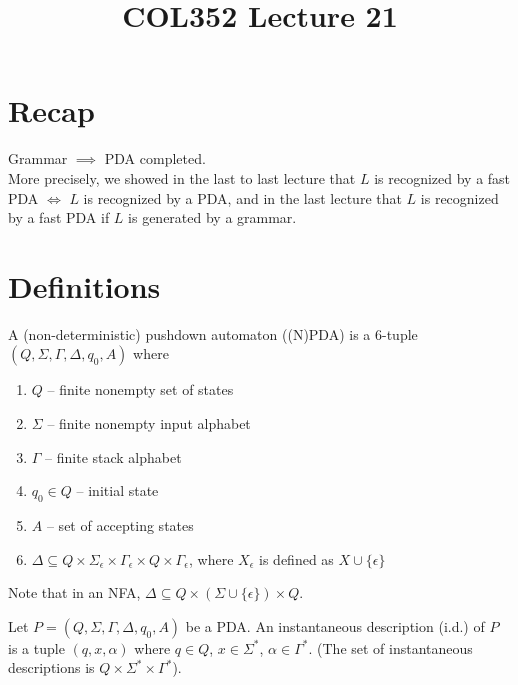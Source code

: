 \documentclass[a4paper]{article}
\title{\textbf{COL352 Lecture 21}}
\date{}
\newcommand{\nl}{\vspace{0.2cm}\\}
\begin{document}
\maketitle
\tableofcontents

\section{Recap}

Grammar $\implies$ PDA completed.\nl
More precisely, we showed in the last to last lecture that $L$ is recognized by a fast PDA $\iff$ $L$ is recognized by a PDA, and in the last lecture that $L$ is recognized by a fast PDA if $L$ is
generated by a grammar.

\section{Definitions}

\begin{defn}
    A (non-deterministic) pushdown automaton ((N)PDA) is a 6-tuple $(Q, \Sigma, \Gamma, \Delta, q_0, A)$ where
    \begin{enumerate}
        \item $Q$ -- finite nonempty set of states
        \item $\Sigma$ -- finite nonempty input alphabet
        \item $\Gamma$ -- finite stack alphabet
        \item $q_0 \in Q$ -- initial state
        \item $A$ -- set of accepting states
        \item $\Delta \subseteq Q \times \Sigma_\epsilon \times \Gamma_\epsilon \times Q \times \Gamma_\epsilon$, where $X_\epsilon$ is defined as $X \cup \{\epsilon\}$
    \end{enumerate}
\end{defn}

Note that in an NFA, $\Delta \subseteq Q \times (\Sigma \cup \{\epsilon\}) \times Q$.

\begin{defn}
    Let $P = (Q, \Sigma, \Gamma, \Delta, q_0, A)$ be a PDA. An instantaneous description (i.d.) of $P$ is a tuple $(q, x, \alpha)$ where $q \in Q$, $x \in \Sigma^*$, $\alpha \in \Gamma^*$. (The set
    of instantaneous descriptions is $Q \times \Sigma^* \times \Gamma^*$).
\end{defn}
\end{document}
